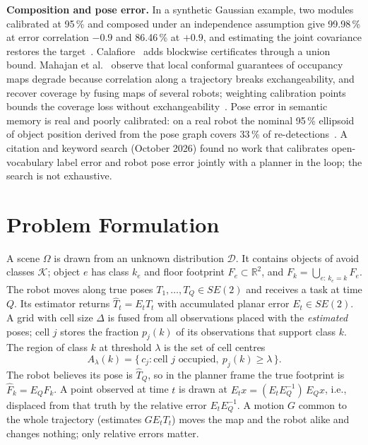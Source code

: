 \documentclass[conference]{IEEEtran}
\theoremstyle{definition}
\begin{document}
\textbf{Composition and pose error.} In a synthetic Gaussian example, two modules calibrated at 95\,\% and composed
under an independence assumption give 99.98\,\% at error correlation $-0.9$ and 86.46\,\% at $+0.9$, and estimating the
joint covariance restores the target~\cite{baral}. Calafiore~\cite{calafiore2026} adds blockwise certificates
through a union bound. Mahajan et al.~\cite{mahajan} observe that local conformal
guarantees of occupancy maps degrade because correlation along a trajectory breaks exchangeability, and recover coverage
by fusing maps of several robots; weighting calibration points bounds the coverage loss without
exchangeability~\cite{barber2023}. Pose error in semantic memory is real and poorly calibrated: on a real robot the
nominal 95\,\% ellipsoid of object position derived from the pose graph covers 33\,\% of
re-detections~\cite{pposemem}. A citation and keyword search (October 2026) found no work that calibrates
open-vocabulary label error and robot pose error jointly with a planner in the loop; the search is not exhaustive.

\section{Problem Formulation}\label{sec:problem}

A scene $\Omega$ is drawn from an unknown distribution $\mathcal D$. It contains objects of avoid classes
$\mathcal K$; object $e$ has class $k_e$ and floor footprint $F_e \subset \mathbb R^2$, and
$F_k = \bigcup_{e:\,k_e = k} F_e$. The robot moves along true poses $T_1, \dots, T_Q \in SE(2)$ and receives a task at
time $Q$. Its estimator returns $\hat T_t = E_t T_t$ with accumulated planar error $E_t \in SE(2)$. A grid with cell
size $\Delta$ is fused from all observations placed with the \emph{estimated} poses; cell $j$ stores the fraction
$p_j(k)$ of its observations that support class $k$. The region of class $k$ at threshold $\lambda$ is the set of cell
centres
\begin{equation}
  A_\lambda(k) = \{\, c_j : \text{cell } j \text{ occupied},\ p_j(k) \ge \lambda \,\}.
\end{equation}
The robot believes its pose is $\hat T_Q$, so in the planner frame the true footprint is $\hat F_k = E_Q F_k$. A point
observed at time $t$ is drawn at $E_t x = (E_t E_Q^{-1})\,E_Q x$, i.e., displaced from that truth by the relative error
$E_t E_Q^{-1}$. A motion $G$ common to the whole trajectory (estimates $G E_t T_t$) moves the map and the robot alike
and changes nothing; only relative errors matter.
\end{document}
